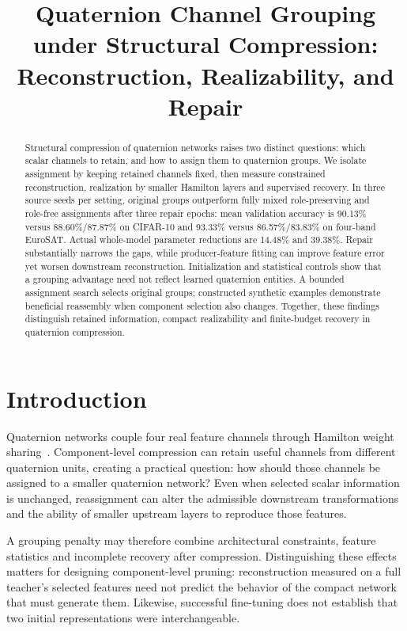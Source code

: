 \documentclass[conference,letterpaper,10pt]{IEEEtran}
\title{Quaternion Channel Grouping under Structural Compression:\\Reconstruction, Realizability, and Repair}
\author{\IEEEauthorblockN{Anonymous Authors}}
\newcommand{\aidraft}{\par\noindent{\footnotesize\textit{AI-assisted drafting}~\cite{OpenAI2026Codex}.}\par}
\begin{document}
\maketitle
\begin{abstract}
Structural compression of quaternion networks raises two distinct questions: which scalar channels to retain, and how to assign them to quaternion groups. We isolate assignment by keeping retained channels fixed, then measure constrained reconstruction, realization by smaller Hamilton layers and supervised recovery. In three source seeds per setting, original groups outperform fully mixed role-preserving and role-free assignments after three repair epochs: mean validation accuracy is 90.13\% versus 88.60\%/87.87\% on CIFAR-10 and 93.33\% versus 86.57\%/83.83\% on four-band EuroSAT. Actual whole-model parameter reductions are 14.48\% and 39.38\%. Repair substantially narrows the gaps, while producer-feature fitting can improve feature error yet worsen downstream reconstruction. Initialization and statistical controls show that a grouping advantage need not reflect learned quaternion entities. A bounded assignment search selects original groups; constructed synthetic examples demonstrate beneficial reassembly when component selection also changes. Together, these findings distinguish retained information, compact realizability and finite-budget recovery in quaternion compression.
\end{abstract}

\section{Introduction}
\aidraft
Quaternion networks couple four real feature channels through Hamilton weight sharing~\cite{GaudetMaida2018DeepQuaternion,Comminiello2024InductiveBiases}. Component-level compression can retain useful channels from different quaternion units, creating a practical question: how should those channels be assigned to a smaller quaternion network? Even when selected scalar information is unchanged, reassignment can alter the admissible downstream transformations and the ability of smaller upstream layers to reproduce those features.

A grouping penalty may therefore combine architectural constraints, feature statistics and incomplete recovery after compression. Distinguishing these effects matters for designing component-level pruning: reconstruction measured on a full teacher's selected features need not predict the behavior of the compact network that must generate them. Likewise, successful fine-tuning does not establish that two initial representations were interchangeable.
\end{document}
